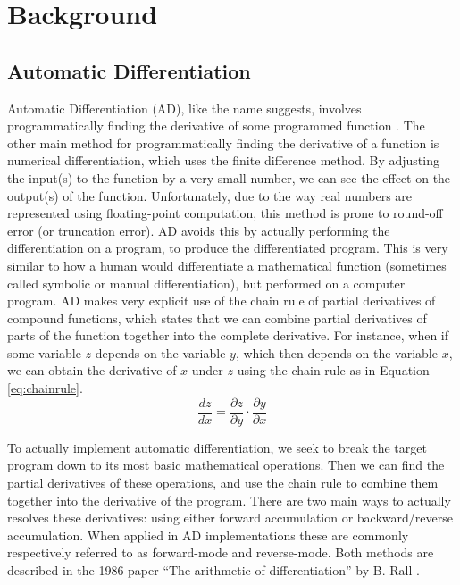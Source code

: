 \section{Background}
    \subsection{Automatic Differentiation} \label{sec:bg_ad}
        Automatic Differentiation (AD), like the name suggests, involves programmatically finding the derivative of some programmed function \cite{margossian2019review}.
        The other main method for programmatically finding the derivative of a function is numerical differentiation, which uses the finite difference method.
        By adjusting the input(s) to the function by a very small number, we can see the effect on the output(s) of the function.
        Unfortunately, due to the way real numbers are represented using floating-point computation, this method is prone to round-off error (or truncation error).
        AD avoids this by actually performing the differentiation on a program, to produce the differentiated program.
        This is very similar to how a human would differentiate a mathematical function (sometimes called symbolic or manual differentiation), but performed on a computer program.
        AD makes very explicit use of the chain rule of partial derivatives of compound functions, which states that we can combine partial derivatives of parts of the function together into the complete derivative.
        For instance, when if some variable $z$ depends on the variable $y$, which then depends on the variable $x$, we can obtain the derivative of $x$ under $z$ using the chain rule as in Equation \ref{eq:chainrule}.
        \begin{equation} \label{eq:chainrule}
            \frac{dz}{dx}=\frac{\partial z}{\partial y}\cdot\frac{\partial y}{\partial x}
        \end{equation}

        To actually implement automatic differentiation, we seek to break the target program down to its most basic mathematical operations.
        Then we can find the partial derivatives of these operations, and use the chain rule to combine them together into the derivative of the program.
        There are two main ways to actually resolves these derivatives: using either forward accumulation or backward/reverse accumulation.
        When applied in AD implementations these are commonly respectively referred to as forward-mode and reverse-mode.
        Both methods are described in the 1986 paper ``The arithmetic of differentiation'' by B. Rall \cite{rall1986arithmetic}.
        
